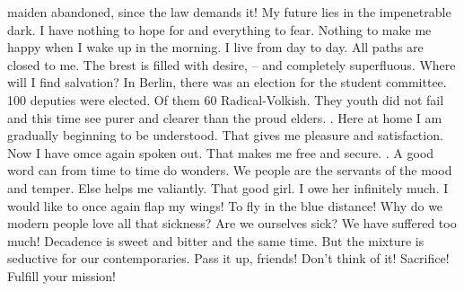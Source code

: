 maiden abandoned, since the law demands it! My future lies in the impenetrable dark. I have nothing to hope for and everything to fear. Nothing to make me happy when I wake up in the morning. I live from day to day. All paths are closed to me. The brest is filled with desire, -- and completely superfluous. Where will I find salvation? In Berlin, there was an election for the student committee. 100 deputies were elected. Of them 60 Radical-Volkish. They youth did not fail and this time see purer and clearer than the proud elders. . Here at home I am gradually beginning to be understood. That gives me pleasure and satisfaction. Now I have omce again spoken out. That makes me free and secure. . A good word can from time to time do wonders. We people are the servants of the mood and temper. Else helps me valiantly. That good girl. I owe her infinitely much. I would like to once again flap my wings! To fly in the blue distance! Why do we modern people love all that sickness? Are we ourselves sick? We have suffered too much! Decadence is sweet and bitter and the same time. But the mixture is seductive for our contemporaries. Pass it up, friends! Don't think of it! Sacrifice! Fulfill your mission!

